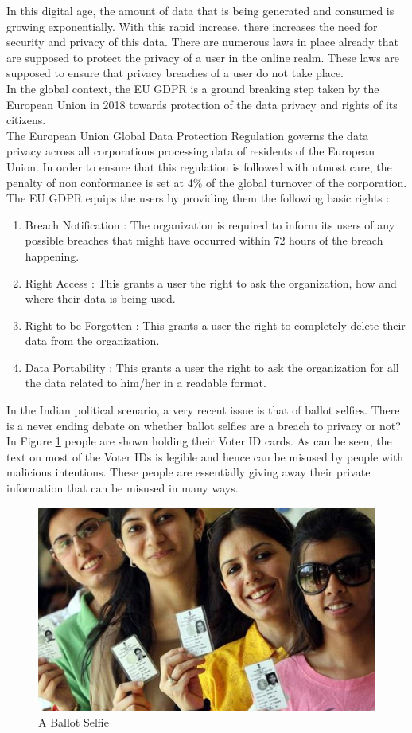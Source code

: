 \documentclass[a4paper,11pt]{article}
\begin{document}
In this digital age, the amount of data that is being generated and consumed is growing exponentially. With this rapid increase, there increases the need for security and privacy of this data.
There are numerous laws in place already that are supposed to protect the privacy of a user in the online realm. These laws are supposed to ensure that privacy breaches of a user do not take place.\medskip\\
In the global context, the EU GDPR is a ground breaking step taken by the European Union in 2018 towards protection of the data privacy and rights of its citizens.\medskip\\
The European Union Global Data Protection Regulation governs the data privacy across all corporations processing data of residents of the European Union. In order to ensure that this regulation is followed with utmost care, the penalty of non conformance is set at 4\% of the global turnover of the corporation.\medskip\\
The EU GDPR equips the users by providing them the following basic rights :
\begin{enumerate}
    \item Breach Notification :
    The organization is required to inform its users of any possible breaches that might have occurred within 72 hours of the breach happening.
    \item Right Access : This grants a user the right to ask the organization, how and where their data is being used.
    \item Right to be Forgotten : This grants a user the right to completely delete their data from the organization.
    \item Data Portability : This grants a user the right to ask the organization for all the data related to him/her in a readable format.
\end{enumerate}
In the Indian political scenario, a very recent issue is that of ballot selfies. There is a never ending debate on whether ballot selfies are a breach to privacy or not? In Figure \ref{fig:example1} people are shown holding their Voter ID cards. As can be seen, the text on most of the Voter IDs is legible and hence can be misused by people with malicious intentions. These people are essentially giving away their private information that can be misused in many ways.\medskip\\
\begin{figure}[h]
    \centering
  \includegraphics[width=11.5cm]{ballot.jpg}
  \caption{A Ballot Selfie}
  \label{fig:example1}
\end{figure}
\end{document}
